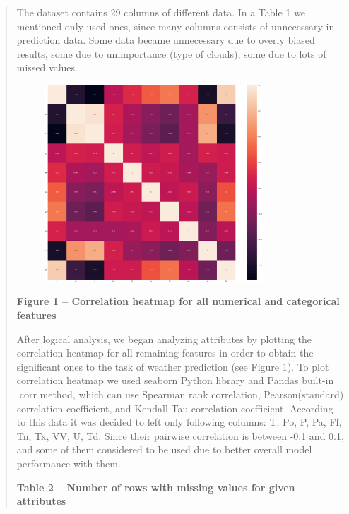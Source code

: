 \begin{quote}
The dataset contains 29 columns of different data. In a Table 1 we
mentioned only used ones, since many columns consists of unnecessary in
prediction data. Some data became unnecessary due to overly biased
results, some due to unimportance (type of clouds), some due to lots of
missed values.

\begin{figure}[H]
	\centering
	\includegraphics[width=0.8\textwidth]{assets/36}
	\caption*{}
\end{figure}

{\bfseries Figure 1 -- Correlation heatmap for all numerical and
categorical features}

After logical analysis, we began analyzing attributes by plotting the
correlation heatmap for all remaining features in order to obtain the
significant ones to the task of weather prediction (see Figure 1). To
plot correlation heatmap we used seaborn Python library and Pandas
built-in .corr method, which can use Spearman rank correlation,
Pearson(standard) correlation coefficient, and Kendall Tau correlation
coefficient. According to this data it was decided to left only
following columns: \textquotesingle T\textquotesingle,
\textquotesingle Po\textquotesingle, \textquotesingle P\textquotesingle,
\textquotesingle Pa\textquotesingle,
\textquotesingle Ff\textquotesingle,
\textquotesingle Tn\textquotesingle,
\textquotesingle Tx\textquotesingle,
\textquotesingle VV\textquotesingle, \textquotesingle U\textquotesingle,
\textquotesingle Td\textquotesingle. Since their pairwise correlation is
between -0.1 and 0.1, and some of them considered to be used due to
better overall model performance with them.

{\bfseries Table 2 -- Number of rows with missing values for given
attributes}
\end{quote}


